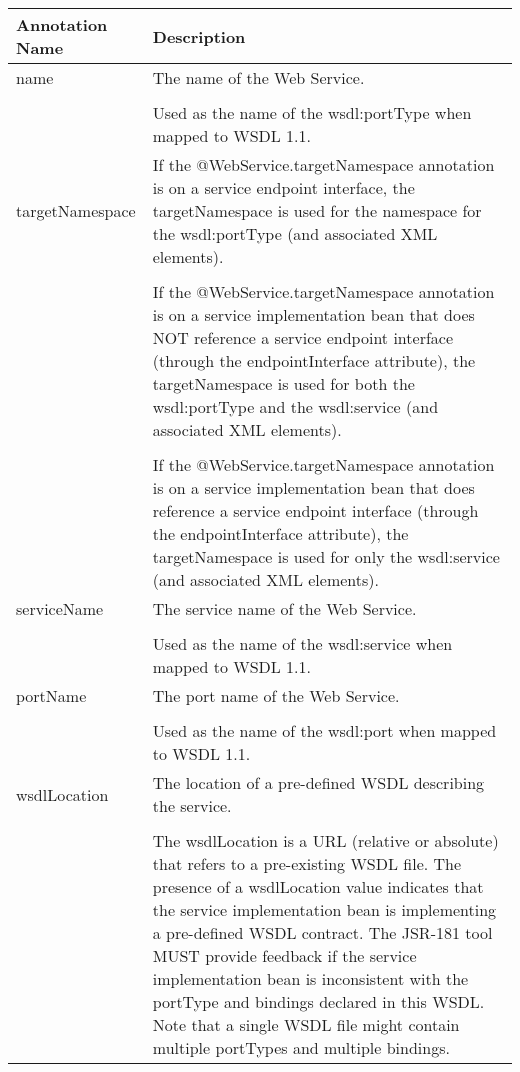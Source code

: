 	\tiny{}
	\begin{tabular}{|p{2cm}|p{11cm}|}
	\hline
	Annotation Name & Description\\
	\hline
	name 			&	The name of the Web Service. \\
	\hfill			&  \\ \hfill
	\hfill			&	Used as the name of the wsdl:portType when mapped to WSDL 1.1. \\
	\hline
	targetNamespace & 	If the @WebService.targetNamespace annotation is on a service endpoint interface, the targetNamespace is used for the namespace
						for the wsdl:portType (and associated XML elements). \\
	\hfill			&  \\ \hfill
	\hfill			&	If the @WebService.targetNamespace annotation is on a service implementation bean that does NOT reference a service endpoint interface 
						(through the endpointInterface attribute), the targetNamespace is used for both the wsdl:portType and the wsdl:service (and associated XML elements). \\
	\hfill			&  \\ \hfill
	\hfill			&	If the @WebService.targetNamespace annotation is on a service implementation bean that does reference a service endpoint interface 
						(through the endpointInterface attribute), the targetNamespace is used for only the wsdl:service (and associated XML elements). 
						\\
	\hline
	serviceName & 	The service name of the Web Service. \\
	\hfill			&  \\ \hfill
	\hfill			&	Used as the name of the wsdl:service when mapped to WSDL 1.1.\\
	\hline
	portName &  	The port name of the Web Service. \\
	\hfill			&  \\ \hfill
	\hfill			&	Used as the name of the wsdl:port when mapped to WSDL 1.1. \\
	\hline
	wsdlLocation & 	The location of a pre-defined WSDL describing the service. \\
	\hfill			&  \\ \hfill
	\hfill			&	The wsdlLocation is a URL (relative or absolute) that refers to a pre-existing WSDL file. The presence of a wsdlLocation value indicates that
					the service implementation bean is implementing a pre-defined WSDL contract. The JSR-181 tool MUST provide feedback if the service implementation 
					bean is inconsistent with the portType and bindings declared in this WSDL. Note that a single WSDL file might contain multiple portTypes and multiple bindings.

\end{tabular}

